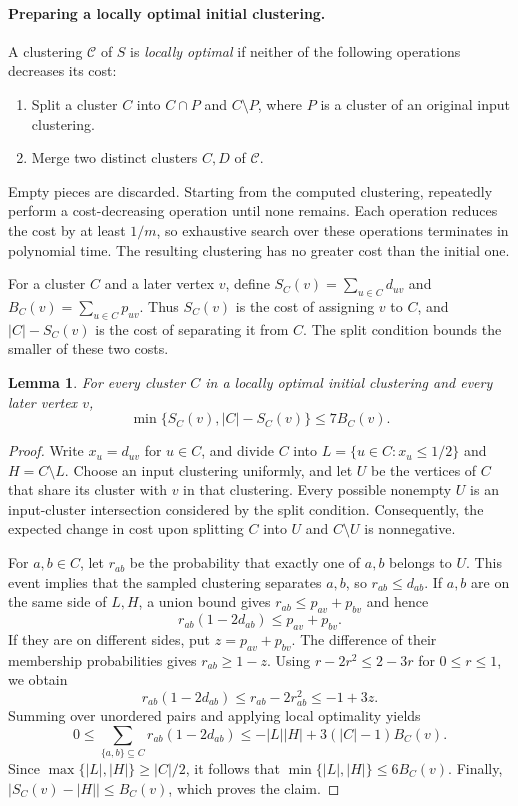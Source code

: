 \documentclass[11pt]{article}
\newtheorem{lemma}[theorem]{Lemma}
\begin{document}
\paragraph{Preparing a locally optimal initial clustering.}
A clustering $\mathcal C$ of $S$ is \emph{locally optimal} if neither of
the following operations decreases its cost:
\begin{enumerate}
\item Split a cluster $C$ into $C\cap P$ and $C\setminus P$, where $P$
      is a cluster of an original input clustering.
\item Merge two distinct clusters $C,D$ of $\mathcal C$.
\end{enumerate}
Empty pieces are discarded. Starting from the computed clustering,
repeatedly perform a cost-decreasing operation until none remains.
Each operation reduces the cost by at least $1/m$, so exhaustive
search over these operations terminates in polynomial time. The
resulting clustering has no greater cost than the initial one.

For a cluster $C$ and a later vertex $v$, define
$S_C(v)=\sum_{u\in C}d_{uv}$ and
$B_C(v)=\sum_{u\in C}p_{uv}$. Thus $S_C(v)$ is the cost of assigning
$v$ to $C$, and $|C|-S_C(v)$ is the cost of separating it from $C$.
The split condition bounds the smaller of these two costs.

\begin{lemma}
\label{seedext:onevertex}
For every cluster $C$ in a locally optimal initial clustering and
every later vertex $v$,
\[
 \min\{S_C(v),|C|-S_C(v)\}\le7B_C(v).
\]
\end{lemma}
\begin{proof}
Write $x_u=d_{uv}$ for $u\in C$, and divide $C$ into
$L=\{u\in C:x_u\le1/2\}$ and $H=C\setminus L$.
Choose an input clustering uniformly, and let $U$ be the vertices of
$C$ that share its cluster with $v$ in that clustering. Every possible
nonempty $U$ is an input-cluster intersection considered by the split
condition. Consequently, the expected change in cost upon splitting
$C$ into $U$ and $C\setminus U$ is nonnegative.

For $a,b\in C$, let $r_{ab}$ be the probability that exactly one of
$a,b$ belongs to $U$. This event implies that the sampled clustering
separates $a,b$, so $r_{ab}\le d_{ab}$. If $a,b$ are on the same side
of $L,H$, a union bound gives $r_{ab}\le p_{av}+p_{bv}$ and hence
\[
 r_{ab}(1-2d_{ab})\le p_{av}+p_{bv}.
\]
If they are on different sides, put $z=p_{av}+p_{bv}$. The difference
of their membership probabilities gives $r_{ab}\ge1-z$. Using
$r-2r^2\le2-3r$ for $0\le r\le1$, we obtain
\[
 r_{ab}(1-2d_{ab})
 \le r_{ab}-2r_{ab}^2
 \le -1+3z.
\]
Summing over unordered pairs and applying local optimality yields
\[
 0\le \sum_{\{a,b\}\subseteq C}r_{ab}(1-2d_{ab})
 \le -|L||H|+3(|C|-1)B_C(v).
\]
Since $\max\{|L|,|H|\}\ge|C|/2$, it follows that
$\min\{|L|,|H|\}\le6B_C(v)$. Finally,
$|S_C(v)-|H||\le B_C(v)$, which proves the claim.
\end{proof}
\end{document}

